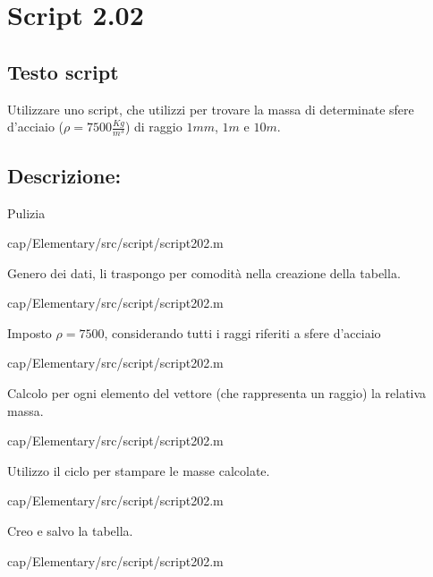 \section{Script 2.02}\label{scr:script202}

\subsection{Testo script}
Utilizzare uno script, che utilizzi  per trovare la 
massa di determinate sfere d'acciaio ($\rho=7500\frac{Kg}{m^3}$) di raggio 
$1mm$, $1m$ e $10m$.

\subsection{Descrizione:}
Pulizia

{cap/Elementary/src/script/script202.m}
\vspace{1em}

Genero dei dati, li traspongo per comodità nella creazione della tabella.

{cap/Elementary/src/script/script202.m}
\vspace{1em}

Imposto $\rho =7500$, considerando tutti i raggi riferiti a sfere d'acciaio 

{cap/Elementary/src/script/script202.m}
\vspace{1em}

Calcolo per ogni elemento del vettore (che rappresenta un raggio) la relativa 
massa.

{cap/Elementary/src/script/script202.m}
\vspace{1em}

Utilizzo il ciclo per stampare le masse calcolate. 

{cap/Elementary/src/script/script202.m}
\vspace{1em}

Creo e salvo la tabella. 

{cap/Elementary/src/script/script202.m}
\vspace{1em}

